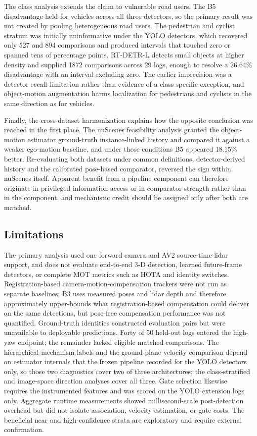 \documentclass[journal]{IEEEtran}
\begin{document}
The class analysis extends the claim to vulnerable road users. The B5 disadvantage held for vehicles across all three detectors, so the primary result was not created by pooling heterogeneous road users. The pedestrian and cyclist stratum was initially uninformative under the YOLO detectors, which recovered only 527 and 894 comparisons and produced intervals that touched zero or spanned tens of percentage points. RT-DETR-L detects small objects at higher density and supplied 1872 comparisons across 29 logs, enough to resolve a 26.64\% disadvantage with an interval excluding zero. The earlier imprecision was a detector-recall limitation rather than evidence of a class-specific exception, and object-motion augmentation harms localization for pedestrians and cyclists in the same direction as for vehicles.

Finally, the cross-dataset harmonization explains how the opposite conclusion was reached in the first place. The nuScenes feasibility analysis \cite{Caesar2020nuScenes} granted the object-motion estimator ground-truth instance-linked history and compared it against a weaker ego-motion baseline, and under those conditions B5 appeared 18.15\% better. Re-evaluating both datasets under common definitions, detector-derived history and the calibrated pose-based comparator, reversed the sign within nuScenes itself. Apparent benefit from a pipeline component can therefore originate in privileged information access or in comparator strength rather than in the component, and mechanistic credit should be assigned only after both are matched.


\subsection{Limitations}
The primary analysis used one forward camera and AV2 source-time lidar support, and does not evaluate end-to-end 3-D detection, learned future-frame detectors, or complete MOT metrics such as HOTA and identity switches. Registration-based camera-motion-compensation trackers \cite{Aharon2022BoTSORT,Yi2024UCMCTrack} were not run as separate baselines; B3 uses measured poses and lidar depth and therefore approximately upper-bounds what registration-based compensation could deliver on the same detections, but pose-free compensation performance was not quantified. Ground-truth identities constructed evaluation pairs but were unavailable to deployable predictions. Forty of 50 held-out logs entered the high-yaw endpoint; the remainder lacked eligible matched comparisons. The hierarchical mechanism labels and the ground-plane velocity comparison depend on estimator internals that the frozen pipeline recorded for the YOLO detectors only, so those two diagnostics cover two of three architectures; the class-stratified and image-space direction analyses cover all three. Gate selection likewise requires the instrumented features and was scored on the YOLO extension logs only. Aggregate runtime measurements showed millisecond-scale post-detection overhead but did not isolate association, velocity-estimation, or gate costs. The beneficial near and high-confidence strata are exploratory and require external confirmation.
\end{document}
